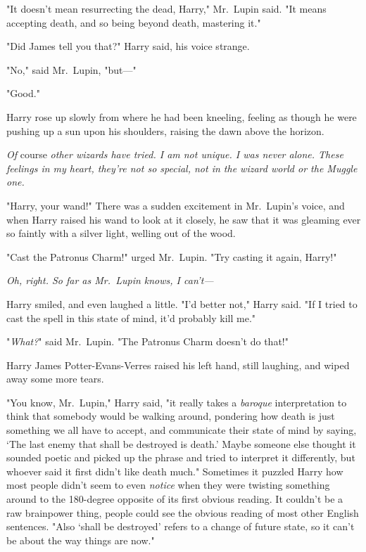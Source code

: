 "It doesn't mean resurrecting the dead, Harry," Mr.~Lupin said. "It means 
accepting death, and so being beyond death, mastering it."

"Did James tell you that?" Harry said, his voice strange.

"No," said Mr.~Lupin, "but---"

"Good."

Harry rose up slowly from where he had been kneeling, feeling as though he were 
pushing up a sun upon his shoulders, raising the dawn above the horizon.

\emph{Of} course \emph{other wizards have tried. I am not unique. I was never 
alone. These feelings in my heart, they're not so special, not in the wizard 
world or the Muggle one.}

"Harry, your wand!" There was a sudden excitement in Mr.~Lupin's voice, and 
when Harry raised his wand to look at it closely, he saw that it was gleaming 
ever so faintly with a silver light, welling out of the wood.

"Cast the Patronus Charm!" urged Mr.~Lupin. "Try casting it again, Harry!"

\emph{Oh, right. So far as Mr.~Lupin knows, I can't---}

Harry smiled, and even laughed a little. "I'd better not," Harry said. "If I 
tried to cast the spell in this state of mind, it'd probably kill me."

"\emph{What?}" said Mr.~Lupin. "The Patronus Charm doesn't do that!"

Harry James Potter-Evans-Verres raised his left hand, still laughing, and wiped 
away some more tears.

"You know, Mr.~Lupin," Harry said, "it really takes a \emph{baroque} 
interpretation to think that somebody would be walking around, pondering how 
death is just something we all have to accept, and communicate their state of 
mind by saying, `The last enemy that shall be destroyed is death.' Maybe 
someone else thought it sounded poetic and picked up the phrase and tried to 
interpret it differently, but whoever said it first didn't like death much." 
Sometimes it puzzled Harry how most people didn't seem to even \emph{notice} 
when they were twisting something around to the 180-degree opposite of its 
first obvious reading. It couldn't be a raw brainpower thing, people could see 
the obvious reading of most other English sentences. "Also `shall be destroyed' 
refers to a change of future state, so it can't be about the way things are 
now."

